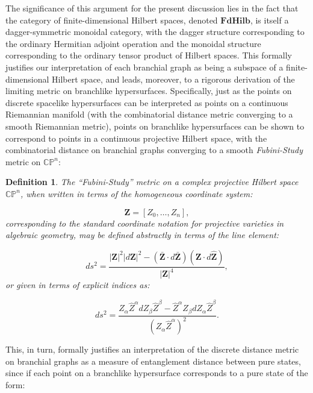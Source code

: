 \documentclass{article}
\newtheorem{definition}{Definition}
\begin{document}
The significance of this argument for the present discussion lies in the fact that the category of finite-dimensional Hilbert spaces, denoted ${\mathbf{FdHilb}}$, is itself a dagger-symmetric monoidal category\cite{selinger}, with the dagger structure corresponding to the ordinary Hermitian adjoint operation and the monoidal structure corresponding to the ordinary tensor product of Hilbert spaces. This formally justifies our interpretation of each branchial graph as being a subspace of a finite-dimensional Hilbert space, and leads, moreover, to a rigorous derivation of the limiting metric on branchlike hypersurfaces. Specifically, just as the points on discrete spacelike hypersurfaces can be interpreted as points on a continuous Riemannian manifold (with the combinatorial distance metric converging to a smooth Riemannian metric), points on branchlike hypersurfaces can be shown to correspond to points in a continuous projective Hilbert space, with the combinatorial distance on branchial graphs converging to a smooth \textit{Fubini-Study} metric on ${\mathbb{CP}^n}$\cite{gorard2}\cite{gorard4}:

\begin{definition}
The ``Fubini-Study'' metric on a complex projective Hilbert space ${\mathbb{CP}^n}$, when written in terms of the homogeneous coordinate system:

\begin{equation}
\mathbf{Z} = \left[ Z_0, \dots, Z_n \right],
\end{equation}
corresponding to the standard coordinate notation for projective varieties in algebraic geometry, may be defined abstractly in terms of the line element:

\begin{equation}
ds^2 = \frac{\left\lvert \mathbf{Z} \right\rvert^2 \left\lvert d \mathbf{Z} \right\rvert^2 - \left( \mathbf{\bar{Z}} \cdot d \mathbf{\bar{Z}} \right) \left( \mathbf{Z} \cdot d \mathbf{\hat{Z}} \right)}{\left\lvert \mathbf{Z} \right\rvert^4},
\end{equation}
or given in terms of explicit indices as:

\begin{equation}
ds^2 = \frac{Z_{\alpha} \hat{Z}^{\alpha} d Z_{\beta} \hat{Z}^{\beta} - \hat{Z}^{\alpha} Z_{\beta} d Z_{\alpha} \hat{Z}^{\beta}}{\left( Z_{\alpha} \hat{Z}^{\alpha} \right)^2}.
\end{equation}
\end{definition}
This, in turn, formally justifies an interpretation of the discrete distance metric on branchial graphs as a measure of entanglement distance between pure states, since if each point on a branchlike hypersurface corresponds to a pure state of the form:
\end{document}
